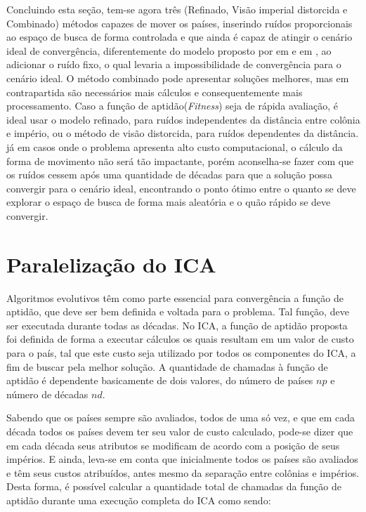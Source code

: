 Concluindo esta seção, tem-se agora três (Refinado, Visão imperial distorcida e Combinado) métodos capazes de mover os países, inserindo ruídos proporcionais ao espaço de busca de forma controlada e que ainda é capaz de atingir o cenário ideal de convergência, diferentemente do modelo proposto por \citeauthor{atashpaz2007imperialist} em \cite{atashpaz2007imperialist} e \citeauthor{roche2011imperialist} em \cite{roche2011imperialist}, ao adicionar o ruído fixo, o qual levaria a impossibilidade de convergência para o cenário ideal. O método combinado pode apresentar soluções melhores, mas em contrapartida são necessários mais cálculos e consequentemente mais processamento. Caso a função de aptidão(\emph{Fitness}) seja de rápida avaliação, é ideal usar o modelo refinado, para ruídos independentes da distância entre colônia e império, ou o método de visão distorcida, para ruídos dependentes da distância. já em casos onde o problema apresenta alto custo computacional, o cálculo da forma de movimento não será tão impactante, porém aconselha-se fazer com que os ruídos cessem após uma quantidade de décadas para que a solução possa convergir para o cenário ideal, encontrando o ponto ótimo entre o quanto se deve explorar o espaço de busca de forma mais aleatória e o quão rápido se deve convergir. 






\section{Paralelização do ICA}

Algoritmos evolutivos têm como parte essencial para convergência a função de aptidão, que deve ser bem definida e voltada para o problema. Tal função, deve ser executada durante todas as décadas. No ICA, a função de aptidão proposta foi definida de forma a executar cálculos os quais resultam em um valor de custo para o país, tal que este custo seja utilizado por todos os componentes do ICA, a fim de buscar pela melhor solução. A quantidade de chamadas à função de aptidão é dependente basicamente de dois valores, do número de países \(np\) e número de décadas \(nd\). 


Sabendo que os países sempre são avaliados, todos de uma só vez, e que em cada década todos os países devem ter seu valor de custo calculado, pode-se dizer que em cada década seus atributos se modificam de acordo com a posição de seus impérios. E ainda, leva-se em conta que inicialmente todos os países são avaliados e têm seus custos atribuídos, antes mesmo da separação entre colônias e impérios. Desta forma, é possível calcular a quantidade total de chamadas da função de aptidão durante uma execução completa do ICA como sendo:


